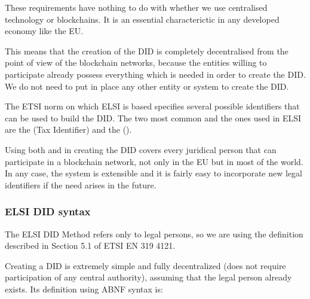 \documentclass[a4paper,12pt,english]{sphinxhowto}
\begin{document}
\sphinxAtStartPar
These requirements have nothing to do with whether we use centralised technology or blockchains. It is an essential characterictic in any developed economy like the EU.

\sphinxAtStartPar
This means that the creation of the DID is completely decentralised from the point of view of the blockchain networks, because the entities willing to participate already possess everything which is needed in order to create the DID. We do not need to put in place any other entity or system to create the DID.

\sphinxAtStartPar
The ETSI norm on which ELSI is based specifies several possible identifiers that can be used to build the DID. The two most common and the ones used in ELSI are the  (Tax Identifier) and the  ().

\sphinxAtStartPar
Using both  and  in creating the DID covers every juridical person that can participate in a blockchain network, not only in the EU but in most of the world. In any case, the system is extensible and it is fairly easy to incorporate new legal identifiers if the need arises in the future.


\subsubsection{ELSI DID syntax}
\label{\detokenize{ssi/didmethods:elsi-did-syntax}}
\sphinxAtStartPar
The ELSI DID Method refers only to legal persons, so we are using the  definition described in Section 5.1 of ETSI EN 319 412\sphinxhyphen{}1.

\sphinxAtStartPar
Creating a DID is extremely simple and fully decentralized (does not require participation of any central authority), assuming that the legal person already exists. Its definition using ABNF syntax is:

\begin{sphinxVerbatim}[commandchars=\\\{\}]
   
\end{sphinxVerbatim}
\end{document}
